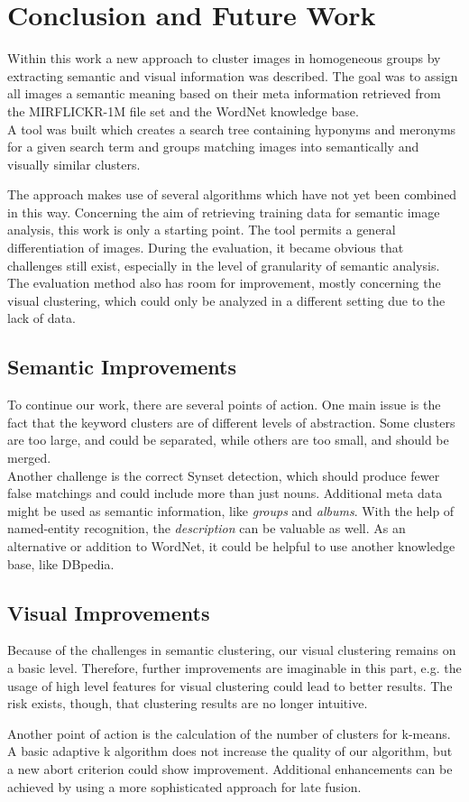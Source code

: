 %
\section{Conclusion and Future Work}
\label{sec_future}
Within this work a new approach to cluster images in homogeneous groups by extracting semantic and visual information was described. The goal was to assign all images a semantic meaning based on their meta information retrieved from the MIRFLICKR-1M file set and the WordNet knowledge base.\\ 
A tool was built which creates a search tree containing hyponyms  and meronyms for a given search term and groups matching images into semantically and visually similar clusters.

\bigskip
The approach makes use of several algorithms which have not yet been combined in this way. Concerning the aim of retrieving training data for semantic image analysis, this work is only a starting point. The tool permits a general differentiation of images. During the evaluation, it became obvious that challenges still exist, especially in the level of granularity of semantic analysis. The evaluation method also has room for improvement, mostly concerning the visual clustering, which could only be analyzed in a different setting due to the lack of data.

\subsection{Semantic Improvements}
To continue our work, there are several points of action. One main issue is the fact that the keyword clusters are of different levels of abstraction. Some clusters are too large, and could be separated, while others are too small, and should be merged. \\
Another challenge is the correct Synset detection, which should produce fewer false matchings and could include more than just nouns.
Additional meta data might be used as semantic information, like \emph{groups} and \emph{albums}. With the help of named-entity recognition, the \emph{description} can be  valuable as well. As an alternative or addition to WordNet, it could be helpful to use another knowledge base, like DBpedia. 

\subsection{Visual Improvements}

Because of the challenges in semantic clustering, our visual clustering remains on a basic level. Therefore, further improvements are imaginable in this part, e.g. the usage of high level features for visual clustering could lead to better results. The risk exists, though, that clustering results are no longer intuitive. 

Another point of action is the calculation of the number of clusters for k-means. A basic adaptive k algorithm does not increase the quality of our algorithm, but a new abort criterion could show improvement. Additional enhancements can be achieved by using a more sophisticated approach for late fusion.